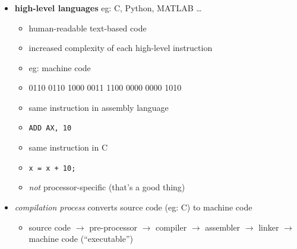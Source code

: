 \documentclass[english,14pt]{beamer}
\newcommand\red[1]{{\color{red} #1}}
\begin{document}
\begin{frame}[fragile]

\frametitle{}

\begin{itemize}
	\item \textbf{high-level languages} eg: C, Python, MATLAB \ldots

	\begin{itemize}
		\item human-readable text-based code
		\item increased complexity of each high-level instruction
		\item eg: machine code
		\item[] 0110 0110 1000 0011 1100 0000 0000 1010
		\item same instruction in assembly language
		\item[] \texttt{ADD AX, 10}
		\item same instruction in C
		\item[] \texttt{x = x + 10;}
		\item \emph{not} processor-specific (that's a good thing)
	\end{itemize}
	
	
	\item \red{\emph{compilation process}} converts source code (eg: C) to machine code
	\begin{itemize}
		\item source code $\rightarrow$ pre-processor $\rightarrow$ compiler $\rightarrow$ assembler $\rightarrow$  linker $\rightarrow$  machine code (``executable'')
	\end{itemize}
	
\end{itemize}

\end{frame}

\end{document}
